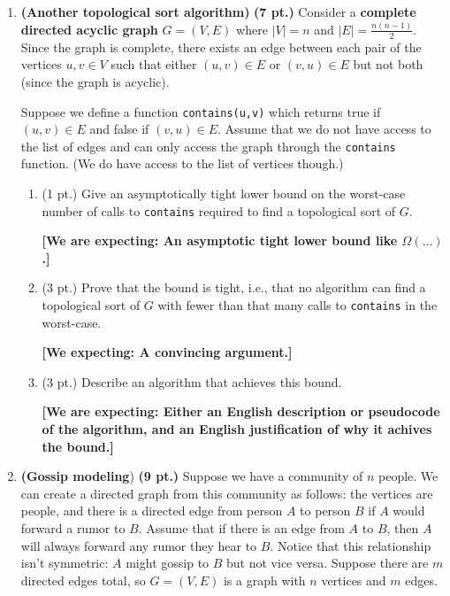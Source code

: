 \documentclass{article}
\begin{document}
\begin{enumerate}

  \item \textbf{(Another topological sort algorithm)} \textbf{(7 pt.)} Consider
    a \textbf{complete directed acyclic graph} $G = (V, E)$ where $|V| = n$ and
    $|E| = \frac{n(n-1)}{2}$. Since the graph is complete, there exists an edge
    between each pair of the vertices $u, v \in V$ such that either
    $(u, v) \in E$ or $(v, u) \in E$ but not both (since the graph is acyclic).

    Suppose we define a function \texttt{contains(u,v)} which returns true if
    $(u, v) \in E$ and false if $(v, u) \in E$. Assume that we do not have
    access to the list of edges and can only access the graph through the
    \texttt{contains} function. (We do have access to the list of vertices
    though.)

    \begin{enumerate}
      \item (1 pt.) Give an asymptotically tight lower bound on the worst-case
      number of calls to \texttt{contains} required to find a topological sort
      of $G$.
      
      \textbf{[We are expecting: An asymptotic tight lower bound like 
      $\Omega(\ldots)$.]}

      \item (3 pt.) Prove that the bound is tight, i.e., that no algorithm can
      find a topological sort of $G$ with fewer than that many calls to
      \texttt{contains} in the worst-case.

      \textbf{[We expecting: A convincing argument.]}

      \item (3 pt.) Describe an algorithm that achieves this bound.

      \textbf{[We are expecting: Either an English description or pseudocode 
      of the algorithm, and an English justification of why it achives the
      bound.]}
    \end{enumerate}

  \item \textbf{(Gossip modeling}) \textbf{(9 pt.)} Suppose we have a community
    of $n$ people. We can create a directed graph from this community as
    follows: the vertices are people, and there is a directed edge from person
    $A$ to person $B$ if $A$ would forward a rumor to $B$. Assume that if there
    is an edge from $A$ to $B$, then $A$ will always forward any rumor they
    hear to $B$. Notice that this relationship isn't symmetric: $A$ might
    gossip to $B$ but not vice versa. Suppose there are $m$ directed edges
    total, so $G = (V,E)$ is a graph with $n$ vertices and $m$ edges.


\end{enumerate}
\end{document}
